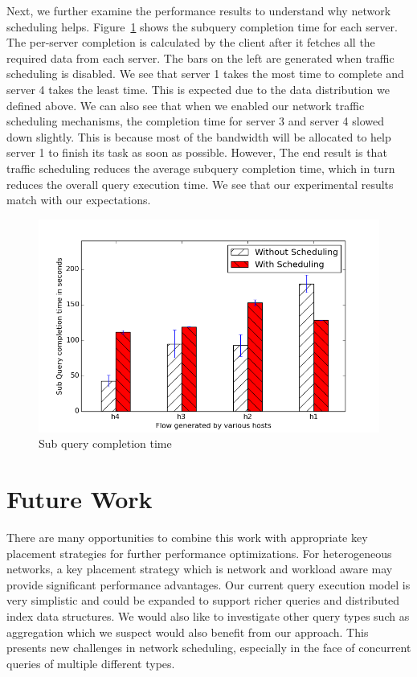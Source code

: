 \documentclass{sig-alternate-2013}
\begin{document}
Next, we further examine the performance results to understand why network scheduling helps.
Figure~\ref{fig:sub_query_completion_8} shows the subquery completion time for each server.
The per-server completion is calculated by the client after it fetches all the required data from each server.
The bars on the left are generated when traffic scheduling is disabled.
We see that server 1 takes the most time to complete and server 4 takes the least time.
This is expected due to the data distribution we defined above.
We can also see that when we enabled our network traffic scheduling mechanisms, the completion time for server 3 and server 4 slowed down slightly.
This is because most of the bandwidth will be allocated to help server 1 to finish its task as soon as possible.
However, The end result is that traffic scheduling reduces the average subquery completion time, which in turn reduces the overall query execution time.
We see that our experimental results match with our expectations.

\begin{figure}
    \centering
    \includegraphics[scale=0.47]{figures/simple_topo_closer_8.png}
    \caption{Sub query completion time}\label{fig:sub_query_completion_8}
\end{figure}

\section{Future Work}

There are many opportunities to combine this work with appropriate key placement strategies for further performance optimizations.
For heterogeneous networks, a key placement strategy which is network and workload aware may provide significant performance advantages.
Our current query execution model is very simplistic and could be expanded to support richer queries and distributed index data structures.
We would also like to investigate other query types such as aggregation which we suspect would also benefit from our approach.
This presents new challenges in network scheduling, especially in the face of concurrent queries of multiple different types.
\end{document}

